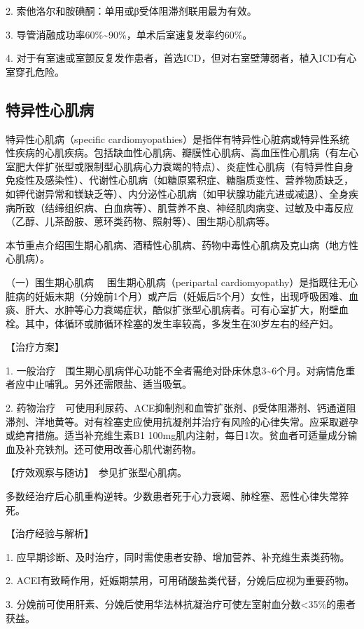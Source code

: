 2. 索他洛尔和胺碘酮：单用或β受体阻滞剂联用最为有效。

3. 导管消融成功率60\%\textasciitilde{}90\%，单术后室速复发率约60\%。

4.
对于有室速或室颤反复发作患者，首选ICD，但对右室壁薄弱者，植入ICD有心室穿孔危险。

\subsection{特异性心肌病}

特异性心肌病（specific
cardiomyopathies）是指伴有特异性心脏病或特异性系统性疾病的心肌疾病。包括缺血性心肌病、瓣膜性心肌病、高血压性心肌病（有左心室肥大伴扩张型或限制型心肌病心力衰竭的特点）、炎症性心肌病（有特异性自身免疫性及感染性）、代谢性心肌病（如糖原累积症、糖脂质变性、营养物质缺乏，如钾代谢异常和镁缺乏等）、内分泌性心肌病（如甲状腺功能亢进或减退）、全身疾病所致（结缔组织病、白血病等）、肌营养不良、神经肌肉病变、过敏及中毒反应（乙醇、儿茶酚胺、蒽环类药物、照射等）、围生期心肌病等。

本节重点介绍围生期心肌病、酒精性心肌病、药物中毒性心肌病及克山病（地方性心肌病）。

{（一）围生期心肌病} 　围生期心肌病（peripartal
cardiomyopathy）是指既往无心脏病的妊娠末期（分娩前1个月）或产后（妊娠后5个月）女性，出现呼吸困难、血痰、肝大、水肿等心力衰竭症状，酷似扩张型心肌病者。可有心室扩大，附壁血栓。其中，体循环或肺循环栓塞的发生率较高，多发生在30岁左右的经产妇。

【治疗方案】

1.
一般治疗　围生期心肌病伴心功能不全者需绝对卧床休息3\textasciitilde{}6个月。对病情危重者应中止哺乳。另外还需限盐、适当吸氧。

2.
药物治疗　可使用利尿药、ACE抑制剂和血管扩张剂、β受体阻滞剂、钙通道阻滞剂、洋地黄等。对有栓塞史应使用抗凝剂并治疗有风险的心律失常。应采取避孕或绝育措施。适当补充维生素B{1}
100mg肌内注射，每日1次。贫血者可适量成分输血及补充铁剂。还可使用改善心肌代谢药物。

【疗效观察与随访】　参见扩张型心肌病。

多数经治疗后心肌重构逆转。少数患者死于心力衰竭、肺栓塞、恶性心律失常猝死。

【治疗经验与解析】

1. 应早期诊断、及时治疗，同时需使患者安静、增加营养、补充维生素类药物。

2. ACEI有致畸作用，妊娠期禁用，可用硝酸盐类代替，分娩后应视为重要药物。

3.
分娩前可使用肝素、分娩后使用华法林抗凝治疗可使左室射血分数\textless{}35\%的患者获益。

